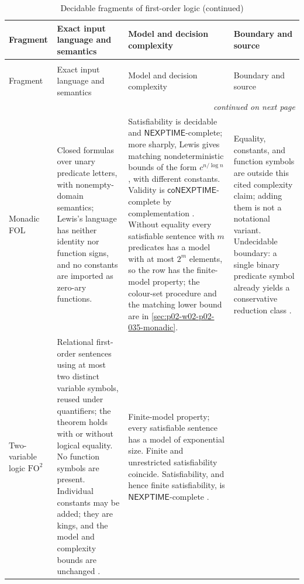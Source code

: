 \begin{landscape}
\begingroup\scriptsize\setlength{\tabcolsep}{3pt}
\begin{longtable}{@{}p{.90in}p{2.20in}p{2.10in}p{2.00in}@{}}
\caption{Decidable fragments of first-order logic.}
\label{tab:p02-decidable-fragments}\\
\toprule
Fragment & Exact input language and semantics & Model and decision complexity & Boundary and source \\ \midrule
\endfirsthead
\caption[]{Decidable fragments of first-order logic (continued)}\\
\toprule
Fragment & Exact input language and semantics & Model and decision complexity & Boundary and source \\ \midrule
\endhead
\midrule\multicolumn{4}{r}{\emph{continued on next page}}\\
\endfoot
\endlastfoot
Monadic FOL
\index{monadic first-order logic} &
Closed formulas over unary predicate letters, with nonempty-domain semantics;
Lewis's language has neither identity nor function signs, and no constants are
imported as zero-ary functions. &
Satisfiability is decidable and \(\mathsf{NEXPTIME}\)-complete; more sharply,
Lewis gives
matching nondeterministic bounds of the form \(c^{n/\log n}\), with different
constants.  Validity is \(\mathsf{coNEXPTIME}\)-complete by complementation
\cite{Lewis1980}.  Without equality every satisfiable sentence with \(m\)
predicates has a model with at most \(2^m\) elements, so the row has the
finite-model property; the colour-set procedure and the matching lower bound are in
\cref{sec:p02-w02-p02-035-monadic}. &
Equality, constants, and function symbols are outside this cited complexity
claim; adding them is not a notational variant.
Undecidable boundary: a single binary predicate symbol already yields a
conservative reduction class \cite[thm.~3.1.23]{BorgerGradelGurevich1997}. \\
\addlinespace
Two-variable logic \(\mathrm{FO}^{2}\)
\index{two-variable logic} &
Relational first-order sentences using at most two distinct variable symbols,
reused under quantifiers; the theorem holds with or without logical equality.
No function symbols are present.  Individual constants may be added; they are
kings, and the model and complexity bounds are unchanged
\cite[p.~11]{GradelKolaitisVardi1997}. &
Finite-model property; every satisfiable sentence has a model of exponential
size.  Finite and unrestricted satisfiability coincide.  Satisfiability, and
hence finite satisfiability, is
\(\mathsf{NEXPTIME}\)-complete \cite{GradelKolaitisVardi1997}.

\end{longtable}
\end{landscape}
